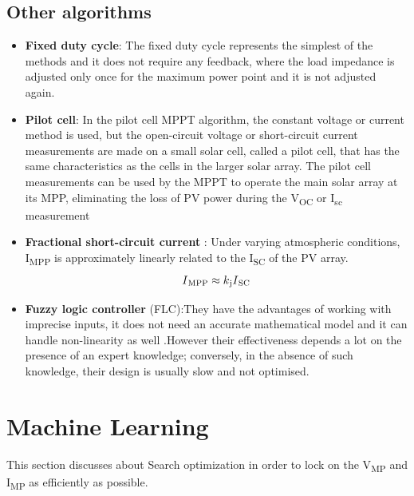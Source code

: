 {\subsection{Other algorithms}
  \begin{itemize}
  \item {\bf Fixed duty cycle}: The fixed duty cycle represents the simplest of the methods and it does not require any feedback, where the load impedance is adjusted only once for the maximum power point and it is not adjusted again.
  \item {\bf Pilot cell}: In the pilot cell MPPT algorithm, the constant voltage or current method is used, but the open-circuit voltage or short-circuit current measurements are made on a small solar cell, called a pilot cell, that has the same characteristics as the cells in the larger solar array. The pilot cell measurements can be used by the MPPT to operate the main solar array at its MPP, eliminating the loss of PV power during the V\textsubscript{OC} or I\textsubscript{sc} measurement
  \item {\bf Fractional short-circuit current }: Under varying atmospheric conditions, I\textsubscript{MPP} is approximately linearly related to the I\textsubscript{SC} of the PV array. \newline
    \begin{equation}
      \begin{aligned}
    I\textsubscript{MPP} \approx k\textsubscript{j}I\textsubscript{SC}
    \label{eq:equ_fracoc_cur}
    \end{aligned}
    \end{equation}
   \item {\bf Fuzzy logic controller} (FLC):They have the advantages of working with imprecise inputs, it does not need an accurate mathematical model and it can handle non-linearity as well \cite{messai2011maximum}.However their effectiveness depends a lot on the presence of an expert knowledge; conversely, in the absence of such knowledge, their design is usually slow and not optimised. 
  \end{itemize} 
  







\section{Machine Learning }
This section discusses about Search optimization in order to lock on the  V\textsubscript{MP} and I\textsubscript{MP} as efficiently as possible.\\

}
